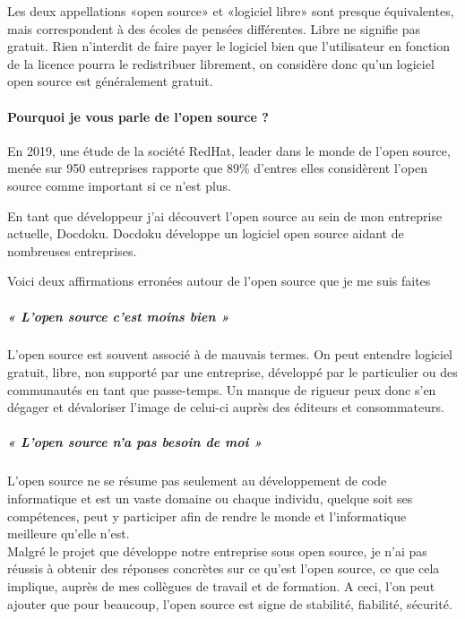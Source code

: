 			Les deux appellations «open source» et «logiciel libre» sont presque équivalentes, mais correspondent à des écoles de pensées différentes. Libre ne signifie pas gratuit.
			Rien n'interdit de faire payer le logiciel bien que l'utilisateur en fonction de la licence pourra le redistribuer librement, on considère donc qu'un logiciel open source est généralement gratuit.
				
		\paragraph{Pourquoi je vous parle de l'open source ?\\}

			En 2019, une étude de la société RedHat, leader dans le monde de l'open source, menée sur 950 entreprises rapporte que 89\% d'entres elles considèrent l'open source comme important si ce n'est plus.

			En tant que développeur j'ai découvert l'open source au sein de mon entreprise actuelle, Docdoku.
			Docdoku développe un logiciel open source aidant de nombreuses entreprises.

			Voici deux affirmations erronées autour de l'open source que je me suis faites
			
			\subparagraph{« L'open source c'est moins bien »\\}

				L'open source est souvent associé à de mauvais termes. On peut entendre logiciel gratuit, libre, non supporté par une entreprise, développé par le particulier ou des communautés en tant que passe-temps. Un manque de rigueur peux donc s'en dégager et dévaloriser l'image de celui-ci auprès des éditeurs et consommateurs.

			\subparagraph{« L'open source n'a pas besoin de moi »\\}

				L'open source ne se résume pas seulement au développement de code informatique et est un vaste domaine ou chaque individu, quelque soit ses compétences, peut y participer afin de rendre le monde et l'informatique meilleure qu'elle n'est.\\

			Malgré le projet que développe notre entreprise sous open source, je n'ai pas réussis à obtenir des réponses concrètes sur ce qu'est l'open source, ce que cela implique, auprès de mes collègues de travail et de formation. A ceci, l'on peut ajouter que pour beaucoup, l'open source est signe de stabilité, fiabilité, sécurité.\\

